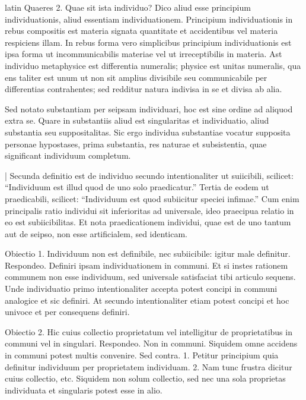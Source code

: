 \begin{otherlanguage*}{latin}
\pstart
 Quaeres 2. Quae sit ista individuo? Dico aliud esse principium individuationis, aliud essentiam individuationem. Principium individuationis in rebus compositis est materia signata quantitate et accidentibus vel materia respiciens illam. In rebus forma vero simplicibus principium individuationis est ipsa forma ut incommunicabilis materiae vel ut irreceptibilis in materia. Ast individuo metaphysice est differentia numeralis; physice est unitas numeralis, qua ens taliter est unum ut non sit amplius divisibile seu communicabile per differentias contrahentes; sed redditur natura indivisa in se et divisa ab alia. 
\pend

\pstart
 Sed notato substantiam per seipsam individuari, hoc est sine ordine ad aliquod extra se. Quare in substantiis aliud est singularitas et individuatio, aliud substantia seu suppositalitas. Sic ergo individua substantiae vocatur supposita personae hypostases, prima substantia, res naturae et subsistentia, quae significant individuum completum. 
\pend

\pstart
 \textnormal{|} Secunda definitio est de individuo secundo intentionaliter ut suiicibili, scilicet: \enquote{Individuum est illud quod de uno solo praedicatur.} Tertia de eodem ut praedicabili, scilicet: \enquote{Individuum est quod subiicitur speciei infimae.} Cum enim principalis ratio individui sit inferioritas ad universale, ideo praecipua relatio in eo est subiicibilitas. Et nota praedicationem individui, quae est de uno tantum aut de seipso, non esse artificialem, sed identicam. 
\pend

\pstart
 Obiectio 1. Individuum non est definibile, nec subiicibile: igitur male definitur. Respondeo. Definiri ipsam individuationem in communi. Et si instes rationem communem non esse individuum, sed universale satisfaciat tibi articulo sequens. Unde individuatio primo intentionaliter accepta potest concipi in communi analogice et sic definiri. At secundo intentionaliter etiam potest concipi et hoc univoce et per consequens definiri. 
\pend

\pstart
 Obiectio 2. Hic cuius collectio proprietatum vel intelligitur de proprietatibus in communi vel in singulari. Respondeo. Non in communi. Siquidem omne accidens in communi potest multis convenire. Sed contra. 1. Petitur principium quia definitur individuum per proprietatem individuam. 2. Nam tunc frustra dicitur cuius collectio, etc. Siquidem non solum collectio, sed nec una sola proprietas individuata et singularis potest esse in alio. 
\pend


\end{otherlanguage*}
